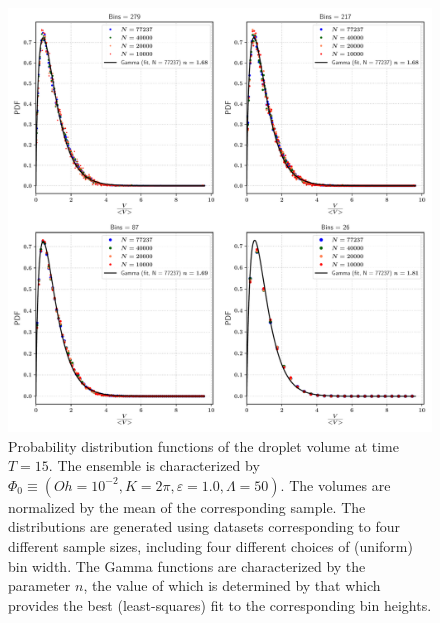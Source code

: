 \begin{figure}
\centering
\includegraphics{plots/drop_stats/short_time_volume_bins.pdf}
\caption{Probability distribution functions of the droplet volume at time $T = 15$. 
The ensemble is characterized by $\Phi_0 \equiv \left( Oh = 10^{-2}, K = 2\pi , \varepsilon = 1.0 , \Lambda = 50 \right)$. 
The volumes are normalized by the mean of the corresponding sample.  
The distributions are generated using datasets corresponding to four different sample sizes, 
including four different choices of (uniform) bin width. 
The Gamma functions are characterized by the parameter $n$, the value of which is determined 
by that which provides the best (least-squares) fit to the corresponding bin heights.  
	}
\label{t1_vol_bins}
\end{figure}


